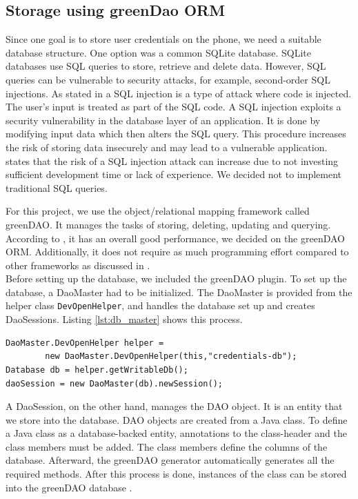 

\subsection{Storage using greenDao ORM}
Since one goal is to store user credentials on the phone, we need a suitable database structure. One option was a common SQLite database. SQLite databases use SQL queries to store, retrieve and delete data. However, SQL queries can be vulnerable to security attacks, for example, second-order SQL injections. As stated in \cite{Halfond2005} a SQL injection is a type of attack where code is injected. The user's input is treated as part of the SQL code. A SQL injection exploits a security vulnerability in the database layer of an application. It is done by modifying input data which then alters the SQL query. This procedure increases the risk of storing data insecurely and may lead to a vulnerable application. \cite{katole2018detection} states that the risk of a SQL injection attack can increase due to not investing sufficient development time or lack of experience. We decided not to implement traditional SQL queries.

For this project, we use the object/relational mapping framework called greenDAO. It manages the tasks of storing, deleting, updating and querying. According to \cite{Greendao}, it has an overall good performance, we decided on the greenDAO ORM. Additionally, it does not require as much programming effort compared to other frameworks as discussed in \cite{pu2016understanding}. \\
Before setting up the database, we included the greenDAO plugin. To set up the database, a DaoMaster had to be initialized. The DaoMaster is provided from the helper class \texttt{DevOpenHelper}, and handles the database set up and creates DaoSessions. Listing \ref{lst:db_master} shows this process.

\begin{lstlisting}[float,floatplacement=h, caption=Creation of Database, label=lst:db_master]
DaoMaster.DevOpenHelper helper = 
        new DaoMaster.DevOpenHelper(this,"credentials-db");
Database db = helper.getWritableDb();
daoSession = new DaoMaster(db).newSession();
\end{lstlisting}

A DaoSession, on the other hand, manages the DAO object. It is an entity that we store into the database. DAO objects are created from a Java class. To define a Java class as a database-backed entity, annotations to the class-header and the class members must be added. The class members define the columns of the database. Afterward, the greenDAO generator automatically generates all the required methods. After this process is done, instances of the class can be stored into the greenDAO database \cite{Greendao}.

